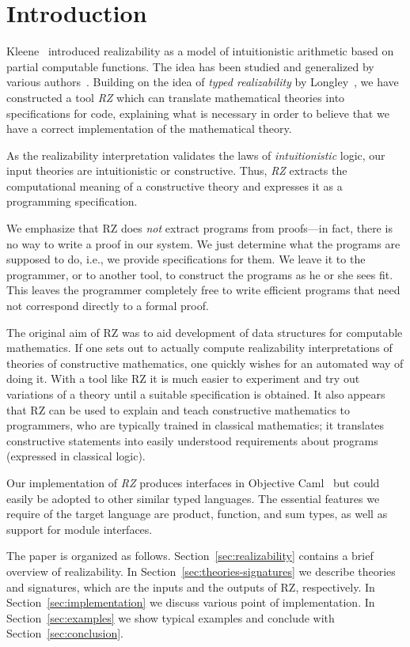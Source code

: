 \section{Introduction}
\label{sec:introduction}

Kleene~\cite{KleeneSC:intint} introduced realizability as a model of
intuitionistic arithmetic based on partial computable functions. The
idea has been studied and generalized by various
authors~\cite{TroelstraA:rea,HylandJ:efft,HylandJ:trit,OostenJ:exer}.
Building on the idea of \emph{typed realizability} by
Longley~\cite{Longley00}, we have constructed a tool \emph{RZ} which
can translate mathematical theories into specifications for code,
explaining what is necessary in order to believe that we have a correct
implementation of the mathematical theory.

As the realizability interpretation validates the laws of
\emph{intuitionistic} logic, our input theories are intuitionistic or
constructive. Thus, \emph{RZ} extracts the computational
meaning of a constructive theory and expresses it as a programming
specification.

We emphasize that RZ does \emph{not} extract programs from proofs---in
fact, there is no way to write a proof in our system. We just
determine what the programs are supposed to do, i.e., we provide
specifications for them. We leave it to the programmer, or to another
tool, to construct the programs as he or she sees fit. This leaves
the programmer completely free to write efficient programs
that need not correspond directly to a formal proof.

The original aim of RZ was to aid development of data structures
for computable mathematics. If one sets out to actually compute
realizability interpretations of theories of constructive mathematics,
one quickly wishes for an automated way of doing it. With a tool like
RZ it is much easier to experiment and try out variations of a theory
until a suitable specification is obtained.  It also appears that
RZ can be used to explain and teach constructive mathematics to
programmers, who are typically trained in classical mathematics; 
it translates constructive statements into easily understood
requirements about programs (expressed in classical logic).

Our implementation of \emph{RZ} produces interfaces in Objective
Caml~\cite{ocaml} but could easily be adopted to other similar typed
languages.  The essential features we require of the target language
are product, function, and sum types, as well as support for module
interfaces.

The paper is organized as follows. Section~\ref{sec:realizability}
contains a brief overview of realizability. In
Section~\ref{sec:theories-signatures} we describe theories and
signatures, which are the inputs and the outputs of RZ, respectively. In
Section~\ref{sec:implementation} we discuss various point of
implementation. In Section~\ref{sec:examples} we show typical examples
and conclude with Section~\ref{sec:conclusion}.


